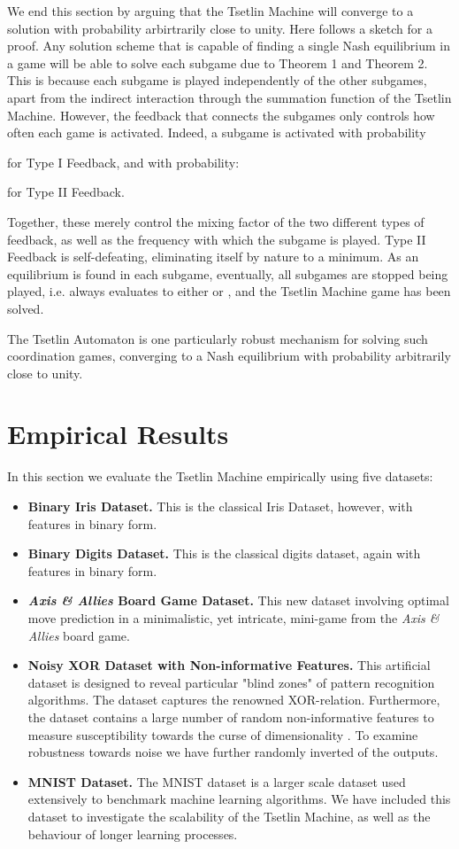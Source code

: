 \documentclass[11pt,a4paper]{article}
\begin{document}
We end this section by arguing that the Tsetlin Machine will converge to a solution  with probability arbirtrarily close to unity. Here follows a sketch for a proof. Any solution scheme that is capable of finding a single Nash equilibrium in a game will be able to solve each subgame   due to Theorem 1 and Theorem 2. This is because each subgame   is played independently of the other subgames, apart from the indirect interaction through the summation function  of the Tsetlin Machine. However, the feedback that connects the subgames only controls how often each game is activated. Indeed, a subgame is activated with probability 

for Type I Feedback, and with probability: 

for Type II Feedback. 

Together, these merely control the mixing factor of the two different types of feedback, as well as the frequency with which the subgame is played. Type II Feedback is self-defeating, eliminating itself by nature to a minimum. As an equilibrium is found in each subgame, eventually, all subgames are stopped being played, i.e.  always evaluates to either  or , and the Tsetlin Machine game has been solved.

The Tsetlin Automaton is one particularly robust mechanism for solving such coordination games, converging to a Nash equilibrium with probability arbitrarily close to unity.

\section{Empirical Results}
\label{sec:empirical_results}

In this section we evaluate the Tsetlin Machine empirically using five datasets:
\begin{itemize}
    \item {\bf Binary Iris Dataset.} This is the classical Iris Dataset, however, with features in binary form.
    \item {\bf Binary Digits Dataset.} This is the classical digits dataset, again with features in binary form.
    \item {\bf \emph{Axis \& Allies} Board Game Dataset.} This new dataset involving optimal move prediction in a minimalistic, yet intricate, mini-game from the \emph{Axis \& Allies} board game.
    \item {\bf Noisy XOR Dataset with Non-informative Features.} This artificial dataset is designed to reveal particular "blind zones" of pattern recognition algorithms. The dataset captures the renowned XOR-relation. Furthermore, the dataset contains a large number of random non-informative features to measure susceptibility towards the curse of dimensionality \cite{Duda2000}. To examine robustness towards noise we have further randomly inverted  of the outputs.
    \item {\bf MNIST Dataset.} The MNIST dataset is a larger scale dataset used extensively to benchmark machine learning algorithms. We have included this dataset to investigate the scalability of the Tsetlin Machine, as well as the behaviour of longer learning processes.
\end{itemize}
\end{document}

